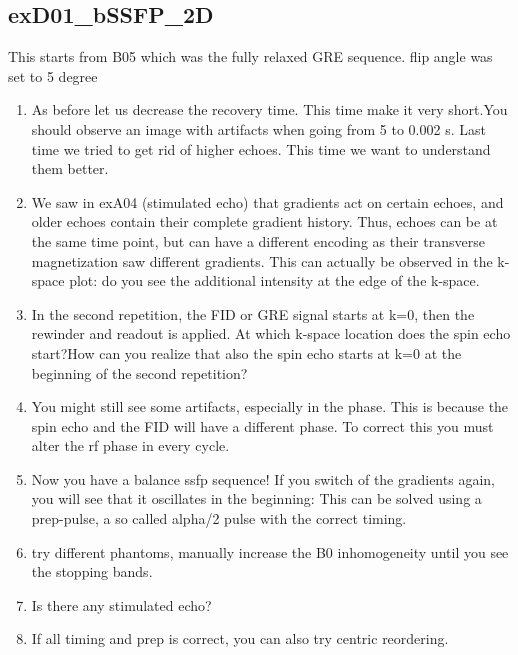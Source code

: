 \documentclass[a4paper,12pt]{extarticle}
\begin{document}
\subsection{exD01\_bSSFP\_2D}
This starts from B05 which was the fully relaxed GRE sequence. 
flip angle was set to 5 degree
\begin{enumerate}

\item As before let us decrease the recovery time. This time make it very short.You should observe an image with artifacts when going from 5 to 0.002 s. Last time we tried to get rid of higher echoes. This time we want to understand them better.
				
\item We saw in exA04 (stimulated echo) that gradients act on certain echoes, and older echoes contain their complete gradient history. Thus, echoes can be at the same time point, but can have a different encoding as their transverse magnetization saw different gradients. This can actually be observed in the k-space plot: do you see the additional intensity at the edge of the k-space.

\item  In the second repetition, the FID or GRE signal starts at k=0, then the rewinder and readout is applied. At which k-space location does the spin echo start?How can you realize that also the spin echo starts at k=0 at the beginning of the second repetition?
\item You might still see some artifacts, especially in the phase. This is because the spin echo and the FID will have a different phase. To correct this you must alter the rf phase in every cycle. 

\item Now you have a balance ssfp sequence!  If you switch of the gradients again, you will see that it oscillates in the beginning: This can be solved using  a prep-pulse, a so called alpha/2 pulse with the correct timing.

\item try different phantoms,  manually increase the B0 inhomogeneity until you see the stopping bands.

\item  Is there any stimulated echo?

\item If all timing and prep is correct, you can also try centric reordering.

\end{enumerate}
\end{document}
